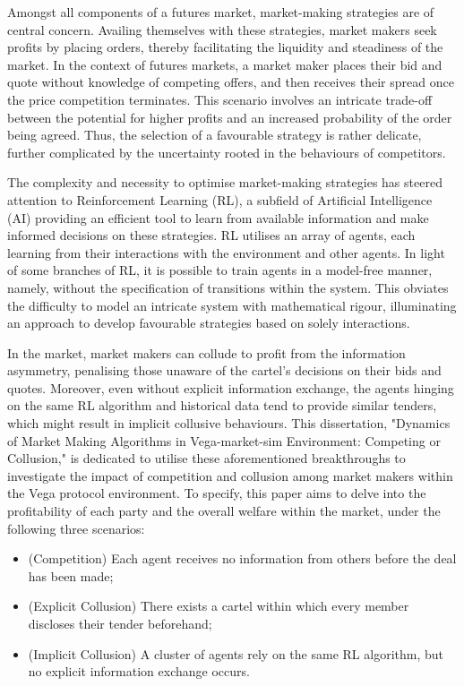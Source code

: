 \documentclass[11pt,twoside]{article}
\numberwithin{Theorem}{section}
\numberwithin{Definition}{section}
\numberwithin{Lemma}{section}
\numberwithin{Algorithm}{section}
\numberwithin{equation}{section}
\begin{document}
Amongst all components of a futures market, market-making strategies are of central concern. Availing themselves with these strategies, market makers seek profits by placing orders, thereby facilitating the liquidity and steadiness of the market. In the context of futures markets, a market maker places their bid and quote without knowledge of competing offers, and then receives their spread once the price competition terminates. This scenario involves an intricate trade-off between the potential for higher profits and an increased probability of the order being agreed. Thus, the selection of a favourable strategy is rather delicate, further complicated by the uncertainty rooted in the behaviours of competitors.

The complexity and necessity to optimise market-making strategies has steered attention to Reinforcement Learning (RL), a subfield of Artificial Intelligence (AI) providing an efficient tool to learn from available information and make informed decisions on these strategies. RL utilises an array of agents, each learning from their interactions with the environment and other agents. In light of some branches of RL, it is possible to train agents in a model-free manner, namely, without the specification of transitions within the system. This obviates the difficulty to model an intricate system with mathematical rigour, illuminating an approach to develop favourable strategies based on solely interactions.

In the market, market makers can collude to profit from the information asymmetry, penalising those unaware of the cartel's decisions on their bids and quotes. Moreover, even without explicit information exchange, the agents hinging on the same RL algorithm and historical data tend to provide similar tenders, which might result in implicit collusive behaviours. This dissertation, "Dynamics of Market Making Algorithms in Vega-market-sim Environment: Competing or Collusion," is dedicated to utilise these aforementioned breakthroughs to investigate the impact of competition and collusion among market makers within the Vega protocol environment. To specify, this paper aims to delve into the profitability of each party and the overall welfare within the market, under the following three scenarios: 
\begin{itemize}
    \item (Competition) Each agent receives no information from others before the deal has been made;    
    \item (Explicit Collusion) There exists a cartel within which every member discloses their tender beforehand;
    \item (Implicit Collusion) A cluster of agents rely on the same RL algorithm, but no explicit information exchange occurs.
\end{itemize}
\end{document}
